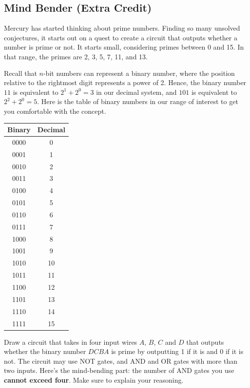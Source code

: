 \documentclass[12pt,letterpaper]{article}
\begin{document}
\subsection*{Mind Bender (Extra Credit)}
{
Mercury has started thinking about prime numbers. Finding so many unsolved conjectures, it starts out on a quest to create a circuit that outputs whether a number is prime or not. It starts small, considering primes between 0 and 15. In that range, the primes are 2, 3, 5, 7, 11, and 13.

Recall that $n$-bit numbers can represent a binary number, where the position relative to the rightmost digit represents a power of 2. Hence, the binary number $11$ is equivalent to $2^1 + 2^0=3$ in our decimal system, and $101$ is equivalent to $2^2+2^0=5$. Here is the table of binary numbers in our range of interest to get you comfortable with the concept.
\begin{center}
    \begin{tabular}{c|c}
	Binary & Decimal\\
	\hline
	0000 & 0\\
	0001 & 1 \\
	0010 & 2 \\
	0011 & 3 \\
	0100 & 4\\
	0101 & 5 \\
	0110 & 6 \\
	0111 & 7 \\
	1000 & 8\\
	1001 & 9 \\
	1010 & 10 \\
	1011 & 11 \\
	1100 & 12 \\
	1101 & 13 \\
	1110 & 14 \\
	1111 & 15 \\
	\end{tabular}
\end{center}

Draw a circuit that takes in four input wires $A$, $B$, $C$ and $D$ that outputs whether the binary number $DCBA$ is prime by outputting 1 if it is and 0 if it is not. The circuit may use NOT gates, and AND and OR gates with more than two inputs. Here's the mind-bending part: the number of AND gates you use \textbf{cannot exceed four}. Make sure to explain your reasoning.
}
\end{document}
